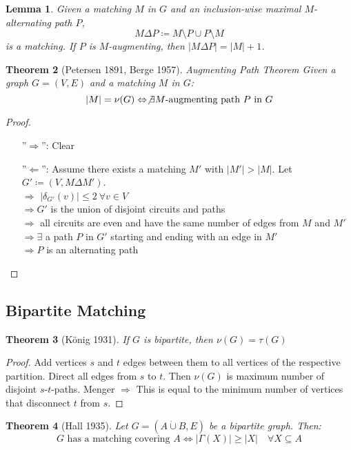 \documentclass[11pt, a4paper]{article}
\newcommand{\abs}[1]{\left\lvert#1\right\rvert}
\newtheorem{theorem}{Theorem}[section]
\newtheorem{lemma}[theorem]{Lemma}
\theoremstyle{remark}
\theoremstyle{definition}
\begin{document}
\begin{lemma}
	Given a matching $M$ in $G$ and an inclusion-wise maximal
	$M$-alternating path $P$,
	\[M\Delta P\coloneqq M\setminus P\cup P\setminus M\]
	is a matching. If $P$ is $M$-augmenting, then
	$\abs{M\Delta P}=\abs{M}+1$.
\end{lemma}

\begin{theorem}[Petersen 1891, Berge 1957]{Augmenting Path Theorem}
	Given a graph $G=(V,E)$ and a matching $M$ in $G$:
	\[\abs{M}=\nu(G) \Leftrightarrow \not\exists \text{$M$-augmenting
	path $P$ in $G$}\]
\end{theorem}
\begin{proof}\ 
\begin{enumerate}
	\item[''$\Rightarrow$'':] Clear
	\item[''$\Leftarrow$'':] Assume there exists a matching $M'$
	with $\abs{M'}>\abs{M}$. Let $G'\coloneqq (V, M\Delta M')$. \\
	$\Rightarrow$ $\abs{\delta_{G'}(v)}\leq 2\ \forall v\in V$ \\
	$\Rightarrow G'$ is the union of disjoint circuits and paths \\
	$\Rightarrow$ all circuits are even and have the same number of edges
	from $M$ and $M'$ \\
	$\Rightarrow \exists$ a path $P$ in $G'$ starting and ending with an
	edge in $M'$ \\
	$\Rightarrow P$ is an alternating path
\end{enumerate}
\end{proof}

\subsection{Bipartite Matching}

\begin{theorem}[König 1931]
	If $G$ is bipartite, then $\nu(G)=\tau(G)$
\end{theorem}
\begin{proof}
	Add vertices $s$ and $t$ edges between them to all vertices of the
	respective partition. Direct all edges from $s$ to $t$. Then
	$\nu(G)$ is maximum number of disjoint $s$-$t$-paths. Menger
	$\Rightarrow$ This is equal to the minimum number of vertices that
	disconnect $t$ from $s$.
\end{proof}

\begin{theorem}[Hall 1935]
	Let $G=(A\dot\cup B, E)$ be a bipartite graph. Then:
	\[
		G\text{ has a matching covering $A$}\Leftrightarrow
		\abs{\Gamma(X)} \geq \abs{X} \quad\forall X\subseteq A
	\]
\end{theorem}
\end{document}
